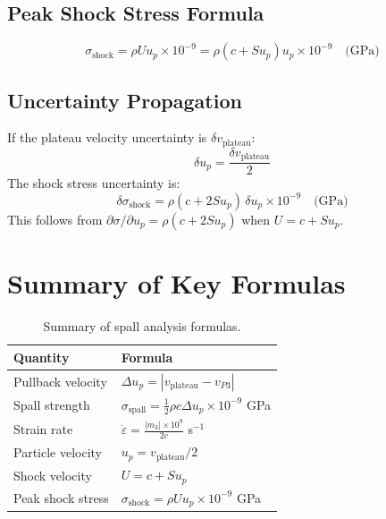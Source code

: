 \subsection{Peak Shock Stress Formula}
\begin{equation}
\sigma_{\text{shock}} = \rho U u_p \times 10^{-9} = \rho (c + S u_p) u_p \times 10^{-9} \quad \text{(GPa)}
\end{equation}

\subsection{Uncertainty Propagation}
If the plateau velocity uncertainty is $\delta v_{\text{plateau}}$:
\begin{equation}
\delta u_p = \frac{\delta v_{\text{plateau}}}{2}
\end{equation}
The shock stress uncertainty is:
\begin{equation}
\delta\sigma_{\text{shock}} = \rho (c + 2 S u_p) \, \delta u_p \times 10^{-9} \quad \text{(GPa)}
\end{equation}
This follows from $\partial\sigma/\partial u_p = \rho(c + 2Su_p)$ when $U = c + Su_p$.

\section{Summary of Key Formulas}

\begin{table}[h]
\centering
\begin{tabular}{ll}
\hline
Quantity & Formula \\
\hline
Pullback velocity & $\Delta u_p = |v_{\text{plateau}} - v_{P3}|$ \\
Spall strength & $\sigma_{\text{spall}} = \frac{1}{2} \rho c \Delta u_p \times 10^{-9}$ GPa \\
Strain rate & $\dot{\varepsilon} = \frac{|m_3| \times 10^9}{2c}$ s$^{-1}$ \\
Particle velocity & $u_p = v_{\text{plateau}} / 2$ \\
Shock velocity & $U = c + S u_p$ \\
Peak shock stress & $\sigma_{\text{shock}} = \rho U u_p \times 10^{-9}$ GPa \\
\hline
\end{tabular}
\caption{Summary of spall analysis formulas.}
\end{table}
